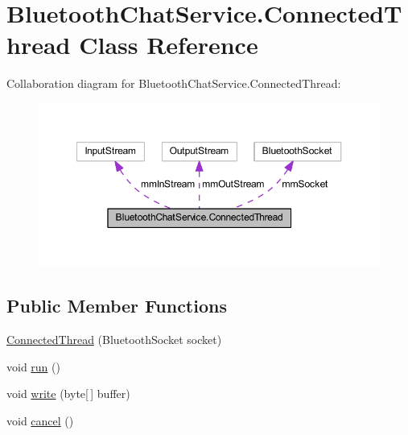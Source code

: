 \hypertarget{classcom_1_1example_1_1android_1_1_bluetooth_chat_1_1_bluetooth_chat_service_1_1_connected_thread}{\section{Bluetooth\-Chat\-Service.\-Connected\-Thread Class Reference}
\label{classcom_1_1example_1_1android_1_1_bluetooth_chat_1_1_bluetooth_chat_service_1_1_connected_thread}
}


Collaboration diagram for Bluetooth\-Chat\-Service.\-Connected\-Thread\-:
\nopagebreak
\begin{figure}[H]
\begin{center}
\leavevmode
\includegraphics[width=350pt]{classcom_1_1example_1_1android_1_1_bluetooth_chat_1_1_bluetooth_chat_service_1_1_connected_thread__coll__graph}
\end{center}
\end{figure}
\subsection*{Public Member Functions}
\begin{DoxyCompactItemize}
\item 
\hyperlink{classcom_1_1example_1_1android_1_1_bluetooth_chat_1_1_bluetooth_chat_service_1_1_connected_thread_a8dc6fa71066e77167173b4e67439b691}{Connected\-Thread} (Bluetooth\-Socket socket)
\item 
void \hyperlink{classcom_1_1example_1_1android_1_1_bluetooth_chat_1_1_bluetooth_chat_service_1_1_connected_thread_a13a43e6d814de94978c515cb084873b1}{run} ()
\item 
void \hyperlink{classcom_1_1example_1_1android_1_1_bluetooth_chat_1_1_bluetooth_chat_service_1_1_connected_thread_ae29f62e52ac434bc0b80facee55ff1c8}{write} (byte\mbox{[}$\,$\mbox{]} buffer)
\item 
void \hyperlink{classcom_1_1example_1_1android_1_1_bluetooth_chat_1_1_bluetooth_chat_service_1_1_connected_thread_a02d5fa6b14e221f3012a794b905be166}{cancel} ()
\end{DoxyCompactItemize}

